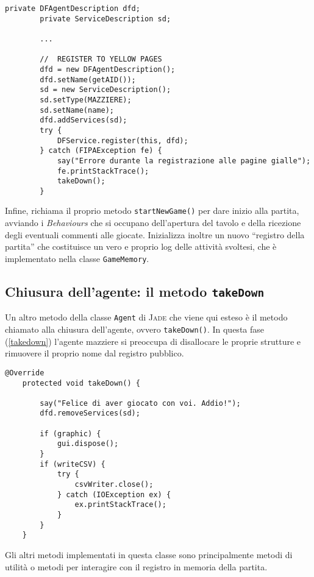 \begin{lstlisting}[caption={stralcio del metodo setup() di MazziereAgent: registrazione al servizio pagine gialle},label=setup2]
        private DFAgentDescription dfd;
        private ServiceDescription sd;
        
        ...
        
        //  REGISTER TO YELLOW PAGES
        dfd = new DFAgentDescription();
        dfd.setName(getAID());
        sd = new ServiceDescription();
        sd.setType(MAZZIERE);
        sd.setName(name);
        dfd.addServices(sd);
        try {
            DFService.register(this, dfd);
        } catch (FIPAException fe) {
            say("Errore durante la registrazione alle pagine gialle");
            fe.printStackTrace();
            takeDown();
        }
\end{lstlisting}

\noindent
Infine, richiama il proprio metodo \texttt{startNewGame()} per dare inizio alla partita, avviando i \emph{Behaviours} che si occupano dell'apertura del tavolo e della ricezione degli eventuali commenti alle giocate.
Inizializza inoltre un nuovo ``registro della partita'' che costituisce un vero e proprio log delle attività svoltesi, che è implementato nella classe \texttt{GameMemory}.







\subsection{Chiusura dell'agente: il metodo \texttt{takeDown}}
Un altro metodo della classe \texttt{Agent} di \textsc{Jade} che viene qui esteso è il metodo chiamato alla chiusura dell'agente, ovvero \texttt{takeDown()}.
In questa fase (\ref{takedown}) l'agente mazziere si preoccupa di disallocare le proprie strutture e rimuovere il proprio nome dal registro pubblico.
\begin{lstlisting}[caption={il metodo takeDown di MazziereAgent},label=takedown]
    @Override
    protected void takeDown() {

        say("Felice di aver giocato con voi. Addio!");
        dfd.removeServices(sd);

        if (graphic) {
            gui.dispose();
        }
        if (writeCSV) {
            try {
                csvWriter.close();
            } catch (IOException ex) {
                ex.printStackTrace();
            }
        }
    }
\end{lstlisting}

\noindent
Gli altri metodi implementati in questa classe sono principalmente metodi di utilità o metodi per interagire con il registro in memoria della partita.

